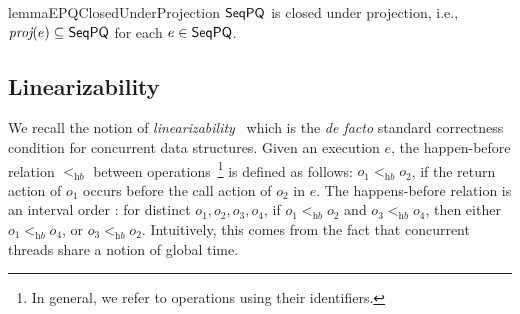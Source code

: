 \begin{restatable}{lemma}{EPQClosedUnderProjection}
\label{lem:closure_proj}
$\mathsf{SeqPQ}$ is closed under projection, i.e., $\textit{proj}(e)\subseteq \mathsf{SeqPQ}$ for each $e\in \mathsf{SeqPQ}$.
\end{restatable}


\subsection{Linearizability}\label{ssec:lin}

%
We recall the notion of \emph{linearizability}~\cite{journals/toplas/HerlihyW90} which is the \emph{de facto} standard correctness condition for concurrent data structures.
Given an execution $e$, the happen-before relation $<_{\textit{hb}}$ between operations~\footnote{In general, we refer to operations using their identifiers.} is defined as follows: $o_1 <_{\textit{hb}} o_2$, if the return action of $o_1$ occurs before the call action of $o_2$ in $e$. The happens-before relation is an interval order \cite{DBLP:conf/popl/BouajjaniEEH15}: for distinct $o_1,o_2,o_3,o_4$, if $o_1 <_{\textit{hb}} o_2$ and $o_3 <_{\textit{hb}} o_4$, then either $o_1 <_{\textit{hb}} o_4$, or $o_3 <_{\textit{hb}} o_2$. Intuitively, this comes from the fact that concurrent threads share a notion of global time.

